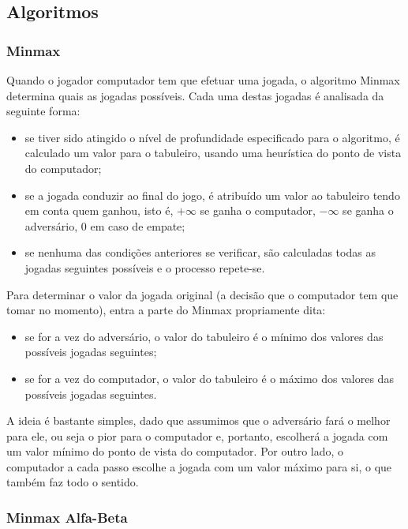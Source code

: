 
\subsection{Algoritmos}

\subsubsection{Minmax}

Quando o jogador computador tem que efetuar uma jogada, o algoritmo Minmax determina quais as jogadas possíveis. Cada uma destas jogadas é analisada da seguinte forma:
\begin{itemize}
	\item se tiver sido atingido o nível de profundidade especificado para o algoritmo, é calculado um valor para o tabuleiro, usando uma heurística do ponto de vista do computador;
	\item se a jogada conduzir ao final do jogo, é atribuído um valor ao tabuleiro tendo em conta quem ganhou, isto é, $+\infty$ se ganha o computador, $-\infty$ se ganha o adversário, $0$ em caso de empate;
	\item se nenhuma das condições anteriores se verificar, são calculadas todas as jogadas seguintes possíveis e o processo repete-se.
\end{itemize}
Para determinar o valor da jogada original (a decisão que o computador tem que tomar no momento), entra a parte do Minmax propriamente dita:
\begin{itemize}
	\item se for a vez do adversário, o valor do tabuleiro é o mínimo dos valores das possíveis jogadas seguintes;
	\item se for a vez do computador, o valor do tabuleiro é o máximo dos valores das possíveis jogadas seguintes.
\end{itemize}

A ideia é bastante simples, dado que assumimos que o adversário fará o melhor para ele, ou seja o pior para o computador e, portanto, escolherá a jogada com um valor mínimo do ponto de vista do computador. Por outro lado, o computador a cada passo escolhe a jogada com um valor máximo para si, o que também faz todo o sentido.

\subsubsection{Minmax Alfa-Beta}

